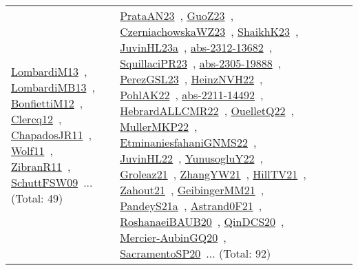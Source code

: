 {\begin{longtable}{lp{3cm}>{\raggedright\arraybackslash}p{6cm}>{\raggedright\arraybackslash}p{6cm}>{\raggedright\arraybackslash}p{8cm}}
\href{works/LombardiM13.pdf}{LombardiM13}~\cite{LombardiM13}, \href{works/LombardiMB13.pdf}{LombardiMB13}~\cite{LombardiMB13}, \href{works/BonfiettiM12.pdf}{BonfiettiM12}~\cite{BonfiettiM12}, \href{works/Clercq12.pdf}{Clercq12}~\cite{Clercq12}, \href{works/ChapadosJR11.pdf}{ChapadosJR11}~\cite{ChapadosJR11}, \href{works/Wolf11.pdf}{Wolf11}~\cite{Wolf11}, \href{works/ZibranR11.pdf}{ZibranR11}~\cite{ZibranR11}, \href{works/SchuttFSW09.pdf}{SchuttFSW09}~\cite{SchuttFSW09}... (Total: 49) & \href{works/PrataAN23.pdf}{PrataAN23}~\cite{PrataAN23}, \href{works/GuoZ23.pdf}{GuoZ23}~\cite{GuoZ23}, \href{works/CzerniachowskaWZ23.pdf}{CzerniachowskaWZ23}~\cite{CzerniachowskaWZ23}, \href{works/ShaikhK23.pdf}{ShaikhK23}~\cite{ShaikhK23}, \href{works/JuvinHL23a.pdf}{JuvinHL23a}~\cite{JuvinHL23a}, \href{works/abs-2312-13682.pdf}{abs-2312-13682}~\cite{abs-2312-13682}, \href{works/SquillaciPR23.pdf}{SquillaciPR23}~\cite{SquillaciPR23}, \href{works/abs-2305-19888.pdf}{abs-2305-19888}~\cite{abs-2305-19888}, \href{works/PerezGSL23.pdf}{PerezGSL23}~\cite{PerezGSL23}, \href{works/HeinzNVH22.pdf}{HeinzNVH22}~\cite{HeinzNVH22}, \href{works/PohlAK22.pdf}{PohlAK22}~\cite{PohlAK22}, \href{works/abs-2211-14492.pdf}{abs-2211-14492}~\cite{abs-2211-14492}, \href{works/HebrardALLCMR22.pdf}{HebrardALLCMR22}~\cite{HebrardALLCMR22}, \href{works/OuelletQ22.pdf}{OuelletQ22}~\cite{OuelletQ22}, \href{works/MullerMKP22.pdf}{MullerMKP22}~\cite{MullerMKP22}, \href{works/EtminaniesfahaniGNMS22.pdf}{EtminaniesfahaniGNMS22}~\cite{EtminaniesfahaniGNMS22}, \href{works/JuvinHL22.pdf}{JuvinHL22}~\cite{JuvinHL22}, \href{works/YunusogluY22.pdf}{YunusogluY22}~\cite{YunusogluY22}, \href{works/Groleaz21.pdf}{Groleaz21}~\cite{Groleaz21}, \href{works/ZhangYW21.pdf}{ZhangYW21}~\cite{ZhangYW21}, \href{works/HillTV21.pdf}{HillTV21}~\cite{HillTV21}, \href{works/Zahout21.pdf}{Zahout21}~\cite{Zahout21}, \href{works/GeibingerMM21.pdf}{GeibingerMM21}~\cite{GeibingerMM21}, \href{works/PandeyS21a.pdf}{PandeyS21a}~\cite{PandeyS21a}, \href{works/Astrand0F21.pdf}{Astrand0F21}~\cite{Astrand0F21}, \href{works/RoshanaeiBAUB20.pdf}{RoshanaeiBAUB20}~\cite{RoshanaeiBAUB20}, \href{works/QinDCS20.pdf}{QinDCS20}~\cite{QinDCS20}, \href{works/Mercier-AubinGQ20.pdf}{Mercier-AubinGQ20}~\cite{Mercier-AubinGQ20}, \href{works/SacramentoSP20.pdf}{SacramentoSP20}~\cite{SacramentoSP20}... (Total: 92)\\

\end{longtable}}
